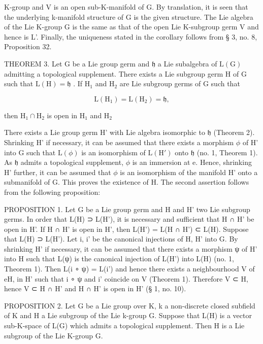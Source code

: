 K-group and V is an open sub-K-manifold of G. By translation, it is seen that the underlying k-manifold structure of G is the given structure. The Lie algebra of the Lie K-group G is the same as that of the open Lie K-subgroup germ V and hence is L'. Finally, the uniqueness stated in the corollary follows from § 3, no. 8, Proposition 32.

THEOREM 3. Let G be a Lie group germ and \(\mathfrak{h}\) a Lie subalgebra of \(\mathrm{L}(\mathrm{G})\) admitting a topological supplement. There exists a Lie subgroup germ H of G such that \(\mathrm{L}(\mathrm{H}) = \mathfrak{h}\) . If \(\mathrm{H}_1\) and \(\mathrm{H}_2\) are Lie subgroup germs of G such that

\[
\mathrm{L} (\mathrm{H} _ {1}) = \mathrm{L} (\mathrm{H} _ {2}) = \mathfrak {h},
\]

then \(\mathrm{H}_1\cap \mathrm{H}_2\) is open in \(\mathrm{H}_1\) and \(\mathrm{H}_2\)

There exists a Lie group germ H' with Lie algebra isomorphic to \(\mathfrak{h}\) (Theorem 2). Shrinking H' if necessary, it can be assumed that there exists a morphism \(\phi\) of H' into G such that \(\mathrm{L}(\phi)\) is an isomorphism of \(\mathrm{L}(\mathrm{H}')\) onto \(\mathfrak{h}\) (no. 1, Theorem 1). As \(\mathfrak{h}\) admits a topological supplement, \(\phi\) is an immersion at e. Hence, shrinking H' further, it can be assumed that \(\phi\) is an isomorphism of the manifold H' onto a submanifold of G. This proves the existence of H. The second assertion follows from the following proposition:

PROPOSITION 1. Let G be a Lie group germ and H and H' two Lie subgroup germs. In order that L(H) ⊃ L(H'), it is necessary and sufficient that H ∩ H' be open in H'. If H ∩ H' is open in H', then L(H') = L(H ∩ H') ⊂ L(H). Suppose that L(H) ⊃ L(H'). Let i, i' be the canonical injections of H, H' into G. By shrinking H' if necessary, it can be assumed that there exists a morphism ψ of H' into H such that L(ψ) is the canonical injection of L(H') into L(H) (no. 1, Theorem 1). Then L(i ∘ ψ) = L(i') and hence there exists a neighbourhood V of eH, in H' such that i ∘ ψ and i' coincide on V (Theorem 1). Therefore V ⊂ H, hence V ⊂ H ∩ H' and H ∩ H' is open in H' (§ 1, no. 10).

PROPOSITION 2. Let G be a Lie group over K, k a non-discrete closed subfield of K and H a Lie subgroup of the Lie k-group G. Suppose that L(H) is a vector sub-K-space of L(G) which admits a topological supplement. Then H is a Lie subgroup of the Lie K-group G.

